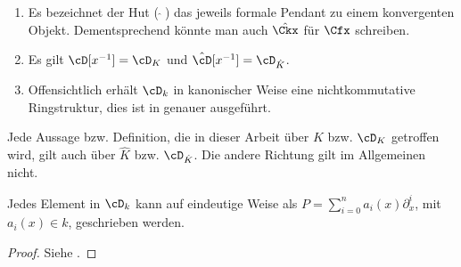 \begin{bem}
\begin{enumerate}
\item Es bezeichnet der Hut ($ \, \hat \,\, $) das jeweils formale Pendant
zu einem konvergenten Objekt. Dementsprechend könnte man auch $\hat{\Ckx}$ für
$\Cfx$ schreiben.
\item Es gilt $\cD[x^{-1}]=\cD_K$ und $\hat \cD[x^{-1}]=\cD_{\hat K}$.
\item Offensichtlich erhält $\cD_k$ in kanonischer Weise eine nichtkommutative
Ringstruktur, dies ist in \cite[Kapittel 2 Section 1]{ZulaBarbara} genauer
ausgeführt.
\end{enumerate}
\end{bem}
\begin{bem} \label{bem:konvToFormal}
Jede Aussage bzw. Definition, die in dieser Arbeit über $K$ bzw. $\cD_K$
getroffen wird, gilt auch über $\hat K$ bzw. $\cD_{\hat K}$. Die andere
Richtung gilt im Allgemeinen nicht.
\end{bem}

\begin{prop} \label{prop:weyl_eindeutige_schreibung}
Jedes Element in $\cD_k$ kann auf eindeutige
Weise als $P=\sum_{i=0}^na_i(x)\partial_x^i$, mit $a_i(x)\in k$, geschrieben
werden.
\end{prop}
\begin{proof}
Siehe \cite[Proposition 1.2.3]{sabbah_cimpa90}.
\end{proof}
\begin{comment}
Gilt das folgende??
\[
\alpha_i(x)\partial_x^i \equiv \frac{\alpha_i}{x^i}(x\partial_x)^i \mod
F_{i-1}\cD
\]
\end{comment}

